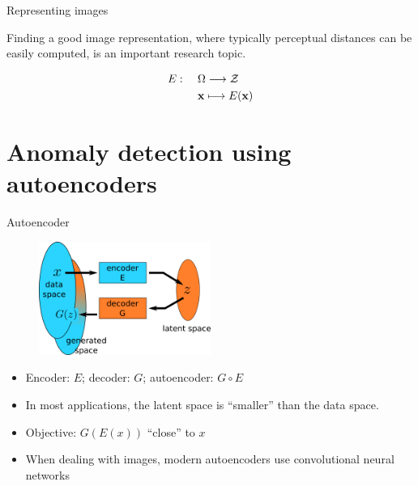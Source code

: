 \documentclass[xcolor=pdftex,dvipsnames,table,mathserif]{beamer}
\begin{document}
\begin{frame}{Representing images}

\begin{block}{}
  Finding a good image representation, where typically perceptual distances can be easily computed, is an important research topic.
\end{block}

    \[
    \begin{split}
    E: & ~~~~\Omega \longrightarrow \mathcal{Z} \\
    & ~~~~ \mathbf{x} \longmapsto E(\mathbf{x})
    \end{split}
    \]

\end{frame}



\section{Anomaly detection using autoencoders}


\begin{frame}{Autoencoder}

  \begin{figure}[ht]
    \centering
    \includegraphics[width=0.5\textwidth]{ae.png}
  \end{figure}

  \begin{itemize}
  \item Encoder: $E$; decoder: $G$; autoencoder: $G \circ E$
  \item In most applications, the latent space is ``smaller'' than the data space.
  \item Objective: $G(E(x))$ ``close'' to $x$
  \item When dealing with images, modern autoencoders use convolutional neural networks
  \end{itemize}

\end{frame}
\end{document}
